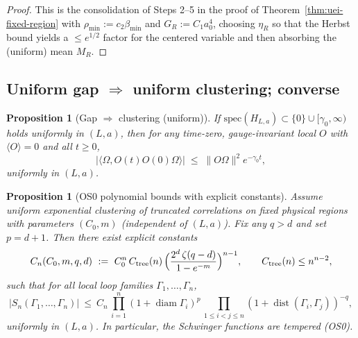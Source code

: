 \documentclass[11pt]{amsart}
\theoremstyle{plain}
\newtheorem{proposition}[theorem]{Proposition}
\theoremstyle{definition}
\theoremstyle{remark}
\begin{document}
\begin{proof}
This is the consolidation of Steps 2--5 in the proof of Theorem~\ref{thm:uei-fixed-region} with $\rho_{\min}:=c_2\beta_{\min}$ and $G_R:=C_1 a_0^4$, choosing $\eta_R$ so that the Herbst bound yields a $\le e^{1/2}$ factor for the centered variable and then absorbing the (uniform) mean $M_R$.
\end{proof}

\subsection*{Uniform gap $\Rightarrow$ uniform clustering; converse}

\begin{proposition}[Gap $\Rightarrow$ clustering (uniform)]\label{prop:gap-to-cluster}
If $\mathrm{spec}(H_{L,a})\subset\{0\}\cup[\gamma_0,\infty)$ holds uniformly in $(L,a)$, then for any time-zero, gauge-invariant local $O$ with $\langle O\rangle=0$ and all $t\ge 0$,
\[
  |\langle\Omega, O(t)O(0)\Omega\rangle|\;\le\;\|O\Omega\|^2 e^{-\gamma_0 t},
\]
uniformly in $(L,a)$.
\end{proposition}

\begin{proposition}[OS0 polynomial bounds with explicit constants]\label{prop:OS0-poly}
Assume uniform exponential clustering of truncated correlations on fixed physical regions with parameters $(C_0,m)$ (independent of $(L,a)$). Fix any $q>d$ and set $p=d+1$. Then there exist explicit constants
\[
  C_n(C_0,m,q,d)\ :=\ C_0^n\,C_{\mathrm{tree}}(n)\,\Bigl(\frac{2^d\,\zeta(q-d)}{1-e^{-m}}\Bigr)^{n-1},\qquad C_{\mathrm{tree}}(n)\le n^{n-2},
\]
such that for all local loop families $\Gamma_1,\dots,\Gamma_n$,
\[
  |S_n(\Gamma_1,\dots,\Gamma_n)|\ \le\ C_n\,\prod_{i=1}^n (1+\operatorname{diam}\Gamma_i)^p\,\prod_{1\le i<j\le n} (1+\operatorname{dist}(\Gamma_i,\Gamma_j))^{-q},
\]
uniformly in $(L,a)$. In particular, the Schwinger functions are tempered (OS0).
\end{proposition}
\end{document}
